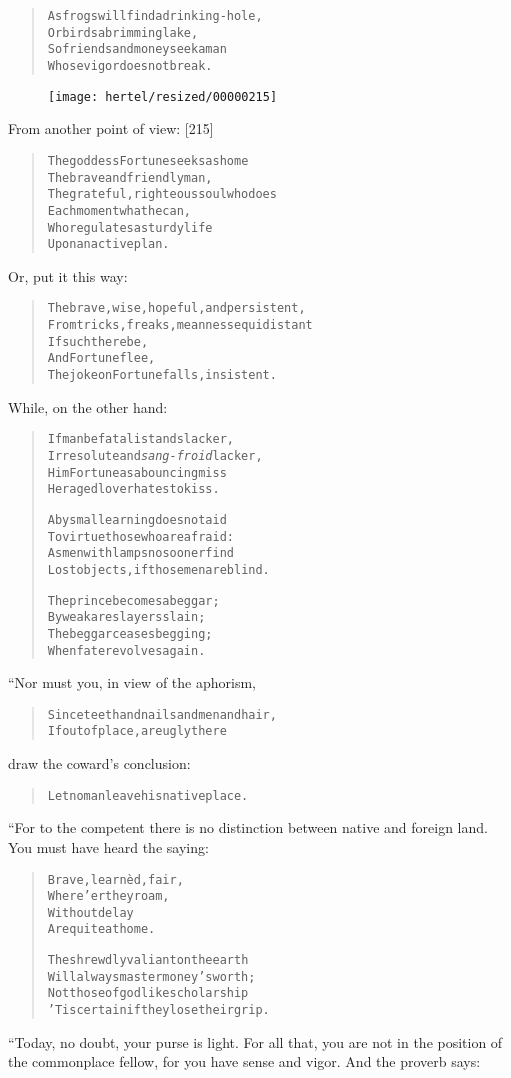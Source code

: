 \documentclass[article, twoside, 10pt]{memoir}
\renewenvironment{verbatim}{%
\begin{quote}%
\vskip -10pt%
\begin{alltt}\normalfont\small}{\end{alltt}%
\end{quote}%
\vskip -10pt
} %
\begin{document}
\begin{verbatim}
As frogs will find a drinking-hole,
    Or birds a brimming lake,
So friends and money seek a man
    Whose vigor does not break.
\end{verbatim}
\begin{figure}[p]\texttt{[image: hertel/resized/00000215]}\end{figure}From another point of view: [215]

\begin{verbatim}
The goddess Fortune seeks as home
    The brave and friendly man,
The grateful, righteous soul who does
    Each moment what he can,
Who regulates a sturdy life
    Upon an active plan.
\end{verbatim}
Or, put it this way:

\begin{verbatim}
The brave, wise, hopeful, and persistent,
From tricks, freaks, meanness equidistant{\textemdash}
    If such there be,
    And Fortune flee,
The joke on Fortune falls, insistent.
\end{verbatim}
While, on the other hand:

\begin{verbatim}
If man be fatalist and slacker,
Irresolute and \emph{sang-froid} lacker,
Him Fortune{\textemdash}as a bouncing miss
Her aged lover{\textemdash}hates to kiss.

Abysmal learning does not aid
To virtue those who are afraid:
As men with lamps no sooner find
Lost objects, if those men are blind.

The prince becomes a beggar;
    By weak are slayers slain;
The beggar ceases begging;
    When fate revolves again.
\end{verbatim}
“Nor must you, in view of the aphorism,

\begin{verbatim}
Since teeth and nails and men and hair,
If out of place, are ugly there
\end{verbatim}
draw the coward's conclusion:

\begin{verbatim}
Let no man leave his native place.
\end{verbatim}
“For to the competent there is no distinction between native and
foreign land. You must have heard the saying:

\begin{verbatim}
Brave, learnèd, fair,
    Where'er they roam,
Without delay
    Are quite at home.

The shrewdly valiant on the earth
Will always master money's worth;
Not those of godlike scholarship{\textemdash}
'Tis certain{\textemdash}if they lose their grip.
\end{verbatim}
“Today, no doubt, your purse is light. For all that, you are not in
the position of the commonplace fellow, for you have sense and
vigor. And the proverb says:
\end{document}
